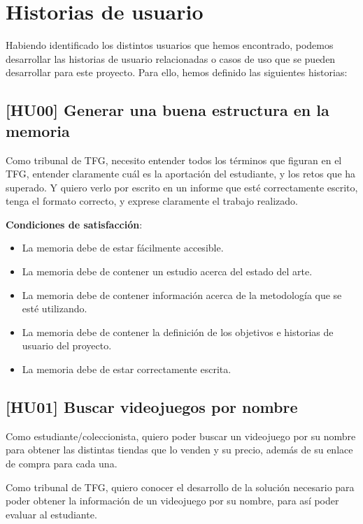 \section{Historias de usuario}

Habiendo identificado los distintos usuarios que hemos encontrado, podemos 
desarrollar las historias de usuario relacionadas o casos de uso que se pueden 
desarrollar para este proyecto. Para ello, hemos definido las siguientes historias:

\subsection{[HU00] Generar una buena estructura en la memoria}

Como tribunal de TFG, necesito entender todos los términos que figuran en el TFG, 
entender claramente cuál es la aportación del estudiante, y los retos que ha 
superado. Y quiero verlo por escrito en un informe que esté correctamente escrito, 
tenga el formato correcto, y exprese claramente el trabajo realizado.

\textbf{Condiciones de satisfacción}:

\begin{itemize}
    \item La memoria debe de estar fácilmente accesible.
    \item La memoria debe de contener un estudio acerca del estado del arte.
    \item La memoria debe de contener información acerca de la metodología que se 
    esté utilizando.
    \item La memoria debe de contener la definición de los objetivos e historias de 
    usuario del proyecto.
    \item La memoria debe de estar correctamente escrita.
\end{itemize}

\subsection{[HU01] Buscar videojuegos por nombre}

Como estudiante/coleccionista, quiero poder buscar un videojuego por su nombre para 
obtener las distintas tiendas que lo venden y su precio, además de su enlace de 
compra para cada una.

Como tribunal de TFG, quiero conocer el desarrollo de la solución necesario para 
poder obtener la información de un videojuego por su nombre, para así poder 
evaluar al estudiante.

